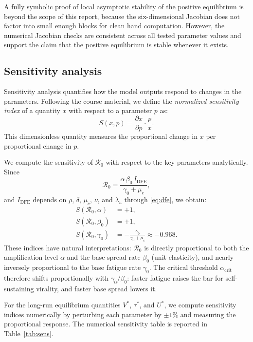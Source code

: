 \documentclass[11pt]{article}
\begin{document}
A fully symbolic proof of local asymptotic stability of the positive equilibrium is beyond the scope of this report, because the six-dimensional Jacobian does not factor into small enough blocks for clean hand computation. However, the numerical Jacobian checks are consistent across all tested parameter values and support the claim that the positive equilibrium is stable whenever it exists.

\subsection{Sensitivity analysis}
\label{sec:sensitivity}

Sensitivity analysis quantifies how the model outputs respond to changes in the parameters. Following the course material, we define the \emph{normalized sensitivity index} of a quantity $x$ with respect to a parameter $p$ as:
\begin{equation}
S(x, p) = \frac{\partial x}{\partial p} \cdot \frac{p}{x}.
\label{eq:sensitivity}
\end{equation}
This dimensionless quantity measures the proportional change in $x$ per proportional change in $p$.

We compute the sensitivity of $\mathcal{R}_0$ with respect to the key parameters analytically. Since
\[
\mathcal{R}_0 = \frac{\alpha\,\beta_0\,I_{\mathrm{DFE}}}{\gamma_0 + \mu_c},
\]
and $I_{\mathrm{DFE}}$ depends on $\rho$, $\delta$, $\mu_c$, $\nu$, and $\lambda_u$ through \eqref{eq:dfe}, we obtain:
\begin{align*}
S(\mathcal{R}_0, \alpha) &= +1, \\
S(\mathcal{R}_0, \beta_0) &= +1, \\
S(\mathcal{R}_0, \gamma_0) &= -\frac{\gamma_0}{\gamma_0 + \mu_c} \approx -0.968.
\end{align*}
These indices have natural interpretations: $\mathcal{R}_0$ is directly proportional to both the amplification level $\alpha$ and the base spread rate $\beta_0$ (unit elasticity), and nearly inversely proportional to the base fatigue rate $\gamma_0$. The critical threshold $\alpha_{\mathrm{crit}}$ therefore shifts proportionally with $\gamma_0/\beta_0$: faster fatigue raises the bar for self-sustaining virality, and faster base spread lowers it.

For the long-run equilibrium quantities $V^*$, $\tau^*$, and $U^*$, we compute sensitivity indices numerically by perturbing each parameter by $\pm 1\%$ and measuring the proportional response. The numerical sensitivity table is reported in Table~\ref{tab:sens}.
\end{document}
